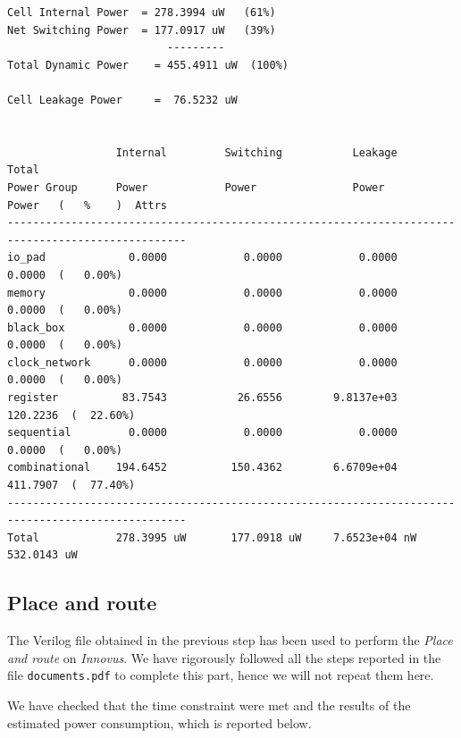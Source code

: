 \begin{Verbatim}[fontsize=\footnotesize]
Cell Internal Power  = 278.3994 uW   (61%)
Net Switching Power  = 177.0917 uW   (39%)
                         ---------
Total Dynamic Power    = 455.4911 uW  (100%)

Cell Leakage Power     =  76.5232 uW


                 Internal         Switching           Leakage            Total
Power Group      Power            Power               Power              Power   (   %    )  Attrs
--------------------------------------------------------------------------------------------------
io_pad             0.0000            0.0000            0.0000            0.0000  (   0.00%)
memory             0.0000            0.0000            0.0000            0.0000  (   0.00%)
black_box          0.0000            0.0000            0.0000            0.0000  (   0.00%)
clock_network      0.0000            0.0000            0.0000            0.0000  (   0.00%)
register          83.7543           26.6556        9.8137e+03          120.2236  (  22.60%)
sequential         0.0000            0.0000            0.0000            0.0000  (   0.00%)
combinational    194.6452          150.4362        6.6709e+04          411.7907  (  77.40%)
--------------------------------------------------------------------------------------------------
Total            278.3995 uW       177.0918 uW     7.6523e+04 nW       532.0143 uW
\end{Verbatim}

\subsection{Place and route}

The Verilog file obtained in the previous step has been used to perform the {\it Place and route} on {\it Innovus}. We have rigorously followed
all the steps reported in the file \verb|documents.pdf| to complete this part, hence we will not repeat them here.

We have checked that the time constraint were met and the results of the estimated power consumption, which is reported below.

